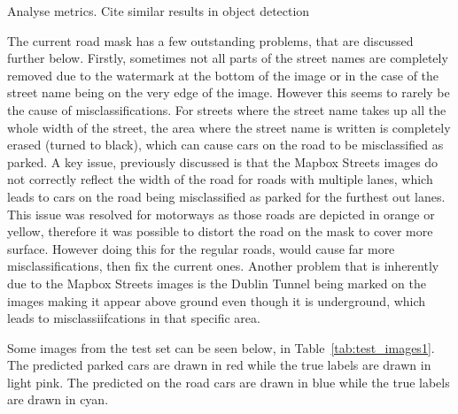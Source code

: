 Analyse metrics. Cite similar results in object detection

The current road mask has a few outstanding problems, that are discussed further below.
Firstly, sometimes not all parts of the street names are completely removed due to the watermark at the bottom of the image or in the case of the street name being on the very edge of the image. However this seems to rarely be the cause of misclassifications.
For streets where the street name takes up all the whole width of the street, the area where the street name is written is completely erased (turned to black), which can cause cars on the road to be misclassified as parked.
A key issue, previously discussed is that the Mapbox Streets images do not correctly reflect the width of the road for roads with multiple lanes, which leads to cars on the road being misclassified as parked for the furthest out lanes.
This issue was resolved for motorways as those roads are depicted in orange or yellow, therefore it was possible to distort the road on the mask to cover more surface. However doing this for the regular roads, would cause far more misclassifications, then fix the current ones.
Another problem that is inherently due to the Mapbox Streets images is the Dublin Tunnel being marked on the images making it appear above ground even though it is underground, which leads to misclassiifcations in that specific area.

Some images from the test set can be seen below, in Table~\ref{tab:test_images1}.
The predicted parked cars are drawn in red while the true labels are drawn in light pink. The predicted on the road cars are drawn in blue while the true labels are drawn in cyan.

